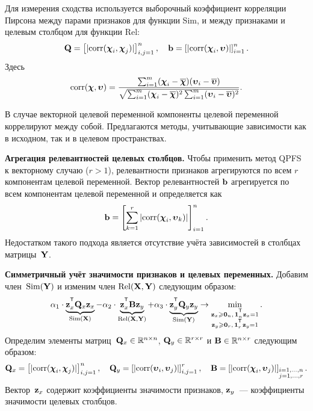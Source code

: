 \documentclass[11pt, a5paper]{dissert}
\begin{document}
Для измерения сходства используется выборочный коэффициент корреляции Пирсона между парами признаков для функции Sim, и между признаками и целевым столбцом для функции Rel:
\begin{equation}
	\mathbf{Q} = \left[|\text{corr}(\boldsymbol{\chi}_i, \boldsymbol{\chi}_j)|\right]_{i,j=1}^n, \quad \mathbf{b} = \left[|\text{corr}(\boldsymbol{\chi}_i, \boldsymbol{\upsilon})|\right]_{i=1}^n.
	\label{ch3:eq:qpfs_1d_qb}
\end{equation}
Здесь
\begin{equation*}
\text{corr}(\boldsymbol{\chi}, \boldsymbol{\upsilon}) = \frac{\sum_{i=1}^m(\boldsymbol{\chi}_i - \overline{\boldsymbol{\chi}})( \boldsymbol{\upsilon}_i - \overline{\boldsymbol{\upsilon}})}{\sqrt{\sum_{i=1}^m(\boldsymbol{\chi}_i - \overline{\boldsymbol{\chi}})^2\sum_{i=1}^m(\boldsymbol{\upsilon}_i - \overline{\boldsymbol{\upsilon}})^2}}.
\end{equation*}

В случае векторной целевой переменной компоненты целевой переменной коррелируют между собой. 
Предлагаются методы, учитывающие зависимости как в исходном, так и в целевом пространствах.

\textbf{Агрегация релевантностей целевых столбцов.}
Чтобы применить метод QPFS к векторному случаю ($r > 1$), релевантности признаков агрегируются по всем $r$ компонентам целевой переменной. 
Вектор релевантностей $\mathbf{b}$ агрегируется по всем компонентам целевой переменной и определяется как
\begin{equation*}
	\mathbf{b} = \left[\sum_{k=1}^r|\text{corr}(\boldsymbol{\chi}_i, \boldsymbol{\upsilon}_k)|\right]_{i=1}^n.
\end{equation*}
Недостатком такого подхода является отсутствие учёта зависимостей в столбцах матрицы~$\mathbf{Y}$. 

\textbf{Симметричный учёт значимости признаков и целевых переменных.}
Добавим член~$\text{Sim}(\mathbf{Y})$ и изменим член $\text{Rel}(\mathbf{X}, \mathbf{Y})$ следующим образом:
\begin{equation}
	\alpha_1 \cdot \underbrace{\bz_x^{\T} \bQ_x \bz_x}_{\text{Sim}(\bX)} - \alpha_2 \cdot \underbrace{\bz_x^{\T} \bB \bz_y}_{\text{Rel}(\bX, \bY)} + \alpha_3 \cdot \underbrace{\bz_y^{\T} \bQ_y \bz_y}_{\text{Sim}(\bY)} \rightarrow \min_{\substack{\bz_x \geq \bZero_n, \, \bOne_n^{\T}\bz_x=1 \\ \bz_y \geq \bZero_r, \, \bOne_r^{\T}\bz_y=1}}.
	\label{ch3:eq:symimp}
\end{equation}
Определим элементы матриц~$\mathbf{Q}_x \in \mathbb{R}^{n \times n}$, $\mathbf{Q}_y \in \mathbb{R}^{r \times r}$ и $\mathbf{B} \in \mathbb{R}^{n \times r}$ следующим образом:
\begin{equation*}
	\mathbf{Q}_x = \left[ |\text{corr}(\boldsymbol{\chi}_i, \boldsymbol{\chi}_j)| \right]_{i,j=1}^n, \quad
	\mathbf{Q}_y = \left[ |\text{corr}(\boldsymbol{\upsilon}_i, \boldsymbol{\upsilon}_j)| \right]_{i,j=1}^r, \quad
	\mathbf{B} =  \left[ |\text{corr}(\boldsymbol{\chi}_i, \boldsymbol{\upsilon}_j)| \right]_{\substack{i=1, \dots, n \\ j=1, \dots, r}}.
\end{equation*}
Вектор~$\mathbf{z}_x$ содержит коэффициенты значимости признаков, $\mathbf{z}_y$~--- коэффициенты значимости целевых столбцов.
\end{document}
